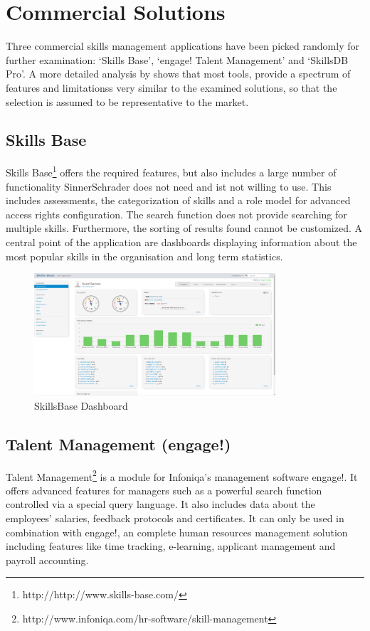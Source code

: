 \section{Commercial Solutions}
Three commercial skills management applications have been picked randomly for further examination: `Skills Base', `engage! Talent Management' and `SkillsDB Pro'.
A more detailed analysis by \cite{Marktanalyse} shows that most tools, provide a spectrum of features and limitationss very similar to the examined solutions, so that the selection is assumed to be representative to the market.

\subsection{Skills Base}
Skills Base\footnote{http://http://www.skills-base.com/} offers the required features, but also includes a large number of functionality SinnerSchrader does not need and ist not willing to use. This includes assessments, the categorization of skills and a role model for advanced access rights configuration.
The search function does not provide searching for multiple skills. Furthermore, the sorting of results found cannot be customized. A central point of the application are dashboards displaying information about the most popular skills in the organisation and long term statistics.
\begin{figure}[!htp]
    \centering
    \includegraphics[width=0.8\textwidth]{images/skillsbase-dashboard.png}
    \caption{SkillsBase Dashboard}
    \label{fig:skillsbase_dashboard}
\end{figure}

\subsection{Talent Management (engage!)}
Talent Management\footnote{http://www.infoniqa.com/hr-software/skill-management} is a module for Infoniqa’s management software engage!. It offers advanced features for managers such as a powerful search function controlled via a special query language. It also includes data about the employees’ salaries, feedback protocols and certificates. It can only be used in combination with engage!, an complete human resources management solution including features like time tracking, e-learning, applicant management and payroll accounting.

